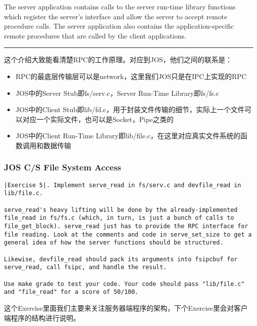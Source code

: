 \documentclass{article}
\begin{document}
\begin{CJK*}{UTF8}{gkai}
{The server application contains calls to the server run-time library functions which register the server's interface and allow the server to accept remote procedure calls. The server application also contains the application-specific remote procedures that are called by the client applications.

}

\vspace{2em}
\hrule
\vspace{2em}

这个介绍大致能看清楚RPC的工作原理。对应到JOS，他们之间的联系是：

\begin{itemize}
\item{RPC的最底层传输层可以是network，这里我们JOS只是在IPC上实现的RPC}
\item{JOS中的Server Stub即fs/serv.c，Server Run-Time Library即fs/fs.c}
\item{JOS中的Client Stub即lib/fd.c，用于封装文件传输的细节，实际上一个文件可以对应一个实际文件，也可以是Socket，Pipe之类的}
\item{JOS中的Client Run-Time Library即lib/file.c，在这里对应真实文件系统的函数调用和数据传输}
\end{itemize}

\subsubsection{JOS C/S File System Access}

\begin{lstlisting}[style=exercise]
|Exercise 5|. Implement serve_read in fs/serv.c and devfile_read in lib/file.c.

serve_read's heavy lifting will be done by the already-implemented file_read in fs/fs.c (which, in turn, is just a bunch of calls to file_get_block). serve_read just has to provide the RPC interface for file reading. Look at the comments and code in serve_set_size to get a general idea of how the server functions should be structured.

Likewise, devfile_read should pack its arguments into fsipcbuf for serve_read, call fsipc, and handle the result.

Use make grade to test your code. Your code should pass "lib/file.c" and "file_read" for a score of 50/100.
\end{lstlisting}

这个Exercise里面我们主要来关注服务器端程序的架构，下个Exercise里会对客户端程序的结构进行说明。


\end{CJK*}
\end{document}
